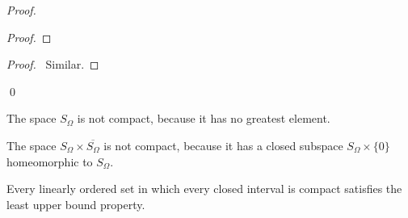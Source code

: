 \begin{proof}
    \pf
    \begin{proof}
    \end{proof}
    \begin{proof}
        \pf\ Similar.
    \end{proof}
    \qed
\end{proof}

\begin{example}
    The space $S_\Omega$ is not compact, because it has no greatest element.
\end{example}

\begin{example}
    The space $S_\Omega \times \overline{S_\Omega}$ is not compact, because it has a closed subspace $S_\Omega \times \{0\}$ homeomorphic to $S_\Omega$.
\end{example}

\begin{proposition}
    Every linearly ordered set in which every closed interval is compact
    satisfies the least upper bound property.
\end{proposition}

